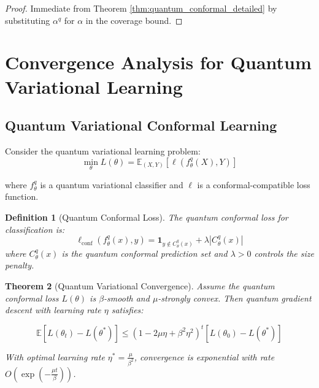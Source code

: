 \documentclass[11pt]{article}
\newtheorem{theorem}{Theorem}[section]
\newtheorem{definition}[theorem]{Definition}
\begin{document}
\begin{proof}
Immediate from Theorem \ref{thm:quantum_conformal_detailed} by substituting $\alpha^q$ for $\alpha$ in the coverage bound.
\end{proof}

\section{Convergence Analysis for Quantum Variational Learning}

\subsection{Quantum Variational Conformal Learning}

Consider the quantum variational learning problem:
$$\min_{\theta} L(\theta) = \mathbb{E}_{(X,Y)} \left[ \ell\left(f_\theta^q(X), Y\right) \right]$$

where $f_\theta^q$ is a quantum variational classifier and $\ell$ is a conformal-compatible loss function.

\begin{definition}[Quantum Conformal Loss]
The quantum conformal loss for classification is:
$$\ell_{\text{conf}}(f_\theta^q(x), y) = \mathbf{1}_{y \notin C_\theta^q(x)} + \lambda |C_\theta^q(x)|$$
where $C_\theta^q(x)$ is the quantum conformal prediction set and $\lambda > 0$ controls the size penalty.
\end{definition}

\begin{theorem}[Quantum Variational Convergence]
\label{thm:variational_convergence}
Assume the quantum conformal loss $L(\theta)$ is $\beta$-smooth and $\mu$-strongly convex. Then quantum gradient descent with learning rate $\eta$ satisfies:

$$\mathbb{E}[L(\theta_t) - L(\theta^*)] \leq (1 - 2\mu\eta + \beta^2\eta^2)^t [L(\theta_0) - L(\theta^*)]$$

With optimal learning rate $\eta^* = \frac{\mu}{\beta^2}$, convergence is exponential with rate $O\left(\exp\left(-\frac{\mu t}{\beta}\right)\right)$.
\end{theorem}
\end{document}
